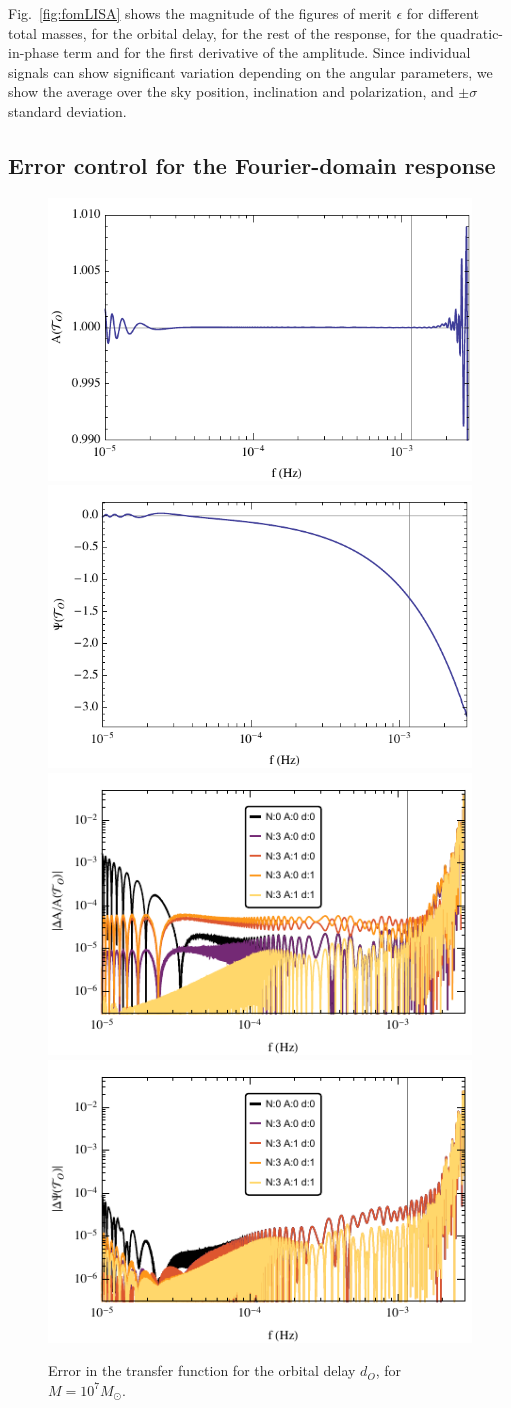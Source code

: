 \documentclass[aps,showpacs,twocolumn,
prd,superscriptaddress,nofootinbib]{revtex4-1}
\newcommand{\Msol}{M_{\odot}}
\begin{document}
Fig.~\ref{fig:fomLISA} shows the magnitude of the figures of merit $\epsilon$ for different total masses, for the orbital delay, for the rest of the response, for the quadratic-in-phase term and for the first derivative of the amplitude. Since individual signals can show significant variation depending on the angular parameters, we show the average over the sky position, inclination and polarization, and $\pm \sigma$ standard deviation.


\subsection{Error control for the Fourier-domain response}
\label{subsec:errorsLISA}

\begin{figure}
  \centering
  \includegraphics[width=.48\linewidth]{plots/LISAtransferM1e7dOamp.pdf}
  \hspace{0.2cm}
  \includegraphics[width=.48\linewidth]{plots/LISAtransferM1e7dOphase.pdf}
  \includegraphics[width=.48\linewidth]{plots/LISAerrorM1e7dOamp.pdf}
  \hspace{0.2cm}
  \includegraphics[width=.48\linewidth]{plots/LISAerrorM1e7dOphase.pdf}
  \caption{Error in the transfer function for the orbital delay $d_{O}$, for $M=10^{7} \Msol$.}
  \label{fig:prectoymodel}
\end{figure}
\end{document}
